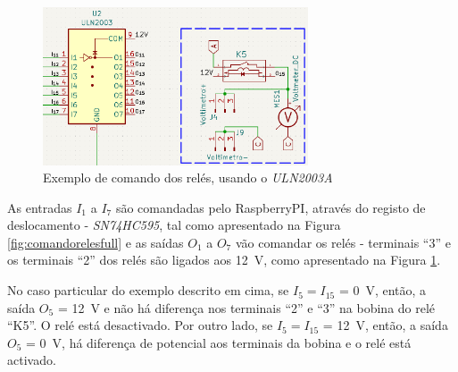 \begin{figure}[hbtp]
	\centering
	\includegraphics[width=0.7\textwidth]{figures/exemplo_voltimetro.png}
	\caption{Exemplo de comando dos relés, usando o \textit{ULN2003A}}
	\label{fig:exemplovoltimetro}
\end{figure}

As entradas $I_{1}$ a $I_{7}$ são comandadas pelo \gls{RaspberryPI}, através do registo de deslocamento - \textit{SN74HC595}, tal como apresentado na Figura \ref{fig:comandorelesfull} e as saídas $O_{1}$ a $O_{7}$ vão comandar os relés - terminais ``3'' e os terminais ``2'' dos relés são ligados aos \SI{12}{\volt}, como apresentado na Figura \ref{fig:exemplovoltimetro}.


No caso particular do exemplo descrito em cima, se $I_{5} = I_{15}$ = \SI{0}{\volt}, então, a saída $O_{5}$ = \SI{12}{\volt} e não há diferença nos terminais ``2'' e ``3'' na bobina do relé  ``K5''. O relé está desactivado. Por outro lado, se $I_{5} = I_{15}$ = \SI{12}{\volt}, então, a saída $O_{5}$ = \SI{0}{\volt}, há diferença de potencial aos terminais da bobina e o relé está activado.


